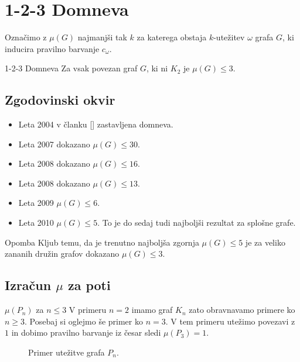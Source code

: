 \documentclass{beamer}
\begin{document}
\section{1-2-3 Domneva}
\begin{frame}
\begin{block}{}
	Označimo z $\mu(G)$ najmanjši tak $k$ za katerega obstaja $k$-utežitev $\omega$ grafa $G$, ki inducira pravilno barvanje $c_{\omega}$.
\end{block}
\begin{block}{1-2-3 Domneva}
	Za vsak povezan graf $G$, ki ni $K_2$ je $\mu(G) \le 3$.
\end{block}
\end{frame}

\subsection{Zgodovinski okvir}
\begin{frame}
\begin{itemize}
	\item Leta 2004 v članku [] zastavljena domneva.
	\item Leta 2007 dokazano $\mu(G) \le 30$.
	\item Leta 2008 dokazano $\mu(G) \le 16$.
	\item Leta 2008 dokazano $\mu(G) \le 13$.
	\item Leta 2009 $\mu(G) \le 6$.
	\item Leta 2010 $\mu(G) \le 5$. To je do sedaj tudi najboljši rezultat za splošne grafe.
\end{itemize}

\begin{block}{Opomba}
	Kljub temu, da je trenutno najboljša zgornja $\mu(G) \le 5$ je za veliko zananih družin grafov dokazano $\mu(G) \le 3$. 
\end{block}
\end{frame}

\subsection{Izračun $\mu$ za poti}
\begin{frame}{$\mu(P_n)$ za $n \le 3$}
V primeru $n=2$ imamo graf $K_n$ zato obravnavamo primere ko $n \ge 3$.  Posebaj si oglejmo še primer ko $n = 3$.  V tem primeru utežimo povezavi z $1$ in dobimo pravilno barvanje iz česar sledi $\mu(P_3) = 1$.

\begin{figure}[!h]
	\centering
	\label{fig:pn}
	\caption{Primer utežitve grafa $P_n$.}
\end{figure}
\end{frame}
\end{document}
